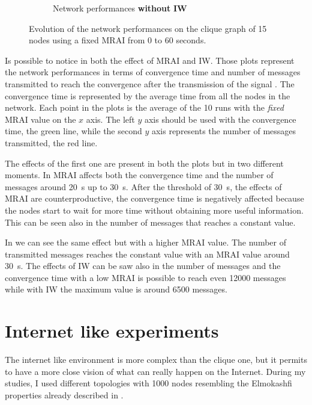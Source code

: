 \begin{figure}[h]
\begin{subfigure}[b]{0.45\textwidth}
		 \caption{Network performances \textbf{without} \textbf{\ac{IW}}}
         \label{fig:clique_evolution_noIW}
     \end{subfigure}
		\caption{Evolution of the network performances on the clique graph of \num{15}
			nodes using a fixed \ac{MRAI} from \num{0} to \num{60} seconds.}
        \label{fig:clique_evolution}
\end{figure}

Is possible to notice in  both the effect of \ac{MRAI}
and \ac{IW}.
Those plots represent the network performances in terms of convergence time and
number of messages transmitted to reach the convergence after the transmission 
of the signal .
The convergence time is represented by the average time from all the nodes in the 
network.
Each point in the plots is the average of the \num{10} runs with the \textit{fixed}
\ac{MRAI} value on the $x$ axis.
The left $y$ axis should be used with the convergence time, the green line, while
the second $y$ axis represents the number of messages transmitted, the red line.

The effects of the first one are present in both the plots but in two different
moments.
In  \ac{MRAI} affects both the convergence time and
the number of messages around \SI{20}{\second} up to \SI{30}{\second}.
After the threshold of \SI{30}{\second}, the effects of \ac{MRAI} are counterproductive,
the convergence time is negatively affected because the nodes start to wait for more
time without obtaining more useful information.
This can be seen also in the number of messages that reaches a constant value.

In  we can see the same effect but with a higher
\ac{MRAI} value.
The number of transmitted messages reaches the constant value with an \ac{MRAI}
value around \SI{30}{\second}.
The effects of \ac{IW} can be saw also in the number of messages and the convergence
time with a low \ac{MRAI} is possible to reach even \num{12000} messages while
with \ac{IW} the maximum value is around \num{6500} messages.


\section{Internet like experiments}
\label{sec:bgp_mrai_internet_like}

The internet like environment is more complex than the clique one, but it permits
to have a more close vision of what can really happen on the Internet.
During my studies, I used different topologies with \num{1000} nodes resembling 
the Elmokashfi properties \cite{elmokashfi2010scalability} already 
described in .

